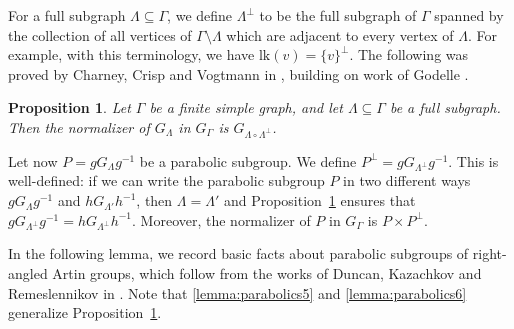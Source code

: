 \documentclass[11pt]{article}
\numberwithin{equation}{section}
\theoremstyle{plain}
\newtheorem{prop}[theo]{Proposition}
\theoremstyle{definition}
\newcommand{\lk}{\mathrm{lk}}
\begin{document}
For a full subgraph $\Lambda\subseteq \Gamma$, we define $\Lambda^{\perp}$ to be the full subgraph of $\Gamma$ spanned by the collection of all vertices of $\Gamma\setminus \Lambda$ which are adjacent to every vertex of $\Lambda$. For example, with this terminology, we have $\lk(v)=\{v\}^\perp$. The following was proved by Charney, Crisp and Vogtmann in \cite[Prop.\,2.2]{charney2007automorphisms}, building on work of Godelle \cite{God}.

\begin{prop}\label{prop:normalizer}
Let $\Gamma$ be a finite simple graph, and let $\Lambda\subseteq\Gamma$ be a full subgraph. Then the normalizer of $G_{\Lambda}$ in $G_{\Gamma}$ is $G_{\Lambda\circ \Lambda^{\perp}}$.
\end{prop}

Let now $P=gG_{\Lambda}g^{-1}$ be a parabolic subgroup. We define $P^\perp=gG_{\Lambda^\perp}g^{-1}$. This is well-defined: if we can write the parabolic subgroup $P$ in two different ways $gG_{\Lambda}g^{-1}$ and $hG_{\Lambda'}h^{-1}$, then $\Lambda=\Lambda'$ and Proposition~\ref{prop:normalizer} ensures that $gG_{\Lambda^\perp}g^{-1}=hG_{\Lambda^\perp}h^{-1}$. Moreover, the normalizer of $P$ in $G_{\Gamma}$ is $P\times P^\perp$.

In the following lemma, we record basic facts about parabolic subgroups of right-angled Artin groups, which follow from the works of Duncan, Kazachkov and Remeslennikov in \cite[\S 2.2]{duncan2007parabolic}. Note that \eqref{lemma:parabolics5} and \eqref{lemma:parabolics6} generalize Proposition~\ref{prop:normalizer}.
\end{document}
